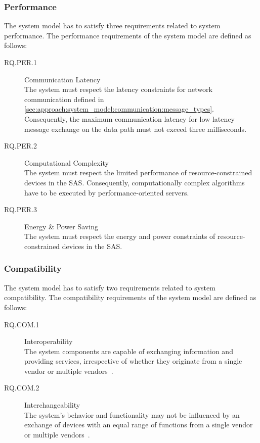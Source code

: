 \subsubsection{Performance}
The system model has to satisfy three requirements related to system performance.
The performance requirements of the system model are defined as follows:
\begin{description}
    \item[RQ.PER.1] Communication Latency\\
    The system must respect the latency constraints for network communication defined in \autoref{sec:approach:system_model:communication:message_types}.
    Consequently, the maximum communication latency for low latency message exchange on the data path must not exceed three milliseconds.
    \item[RQ.PER.2] Computational Complexity\\
    The system must respect the limited performance of resource-constrained devices in the SAS.
    Consequently, computationally complex algorithms have to be executed by performance-oriented servers.
    \item[RQ.PER.3] Energy \& Power Saving\\
    The system must respect the energy and power constraints of resource-constrained devices in the SAS.
\end{description}

\subsubsection{Compatibility}
The system model has to satisfy two requirements related to system compatibility.
The compatibility requirements of the system model are defined as follows:
\begin{description}
    \item[RQ.COM.1] Interoperability\\
    The system components are capable of exchanging information and providing services, irrespective of whether they originate from a single vendor or multiple vendors~\cite{IEC61850P5}.
    \item[RQ.COM.2] Interchangeability\\
    The system's behavior and functionality may not be influenced by an exchange of devices with an equal range of functions from a single vendor or multiple vendors~\cite{IEC61850P5}.
\end{description}

